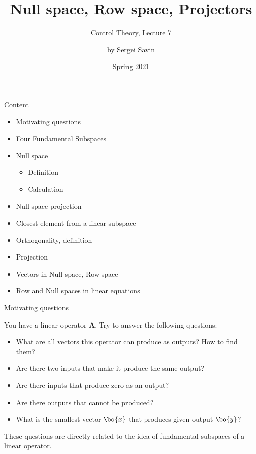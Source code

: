 \documentclass{beamer}
\title{Null space, Row space, Projectors}
\subtitle{Control Theory, Lecture 7}
\author{by Sergei Savin}
\date{Spring 2021}
\begin{document}
\maketitle


\begin{frame}{Content}

\begin{itemize}
\item Motivating questions
\item Four Fundamental Subspaces
\item Null space
\begin{itemize}
    \item Definition
    \item Calculation
\end{itemize}
\item Null space projection
\item Closest element from a linear subspace
\item Orthogonality, definition
\item Projection
\item Vectors in Null space, Row space
\item Row and Null spaces in linear equations
\end{itemize}

\end{frame}




\begin{frame}{Motivating questions}
\begin{flushleft}

You have a linear operator $\mathbf A$. Try to answer the following questions:

\begin{itemize}
    \item What are all vectors this operator can produce as outputs? How to find them?
    \item Are there two inputs that make it produce the same output?
    \item Are there inputs that produce zero as an output?
    \item Are there outputs that cannot be produced? 
    \item What is the smallest vector $\bo{x}$ that produces given output $\bo{y}$? 
\end{itemize}

These questions are directly related to the idea of fundamental subspaces of a linear operator.

\end{flushleft}
\end{frame}
\end{document}
